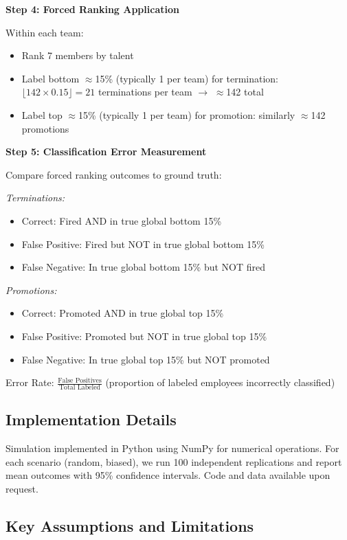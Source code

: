 \documentclass[12pt]{article}
\begin{document}
\textbf{Step 4: Forced Ranking Application}

Within each team:
\begin{itemize}
\item Rank 7 members by talent
\item Label bottom $\approx$15\% (typically 1 per team) for termination: $\lfloor 142 \times 0.15 \rfloor = 21$ terminations per team $\rightarrow$ $\approx$142 total
\item Label top $\approx$15\% (typically 1 per team) for promotion: similarly $\approx$142 promotions
\end{itemize}

\textbf{Step 5: Classification Error Measurement}

Compare forced ranking outcomes to ground truth:

\emph{Terminations:}
\begin{itemize}
\item Correct: Fired AND in true global bottom 15\%
\item False Positive: Fired but NOT in true global bottom 15\%
\item False Negative: In true global bottom 15\% but NOT fired
\end{itemize}

\emph{Promotions:}
\begin{itemize}
\item Correct: Promoted AND in true global top 15\%
\item False Positive: Promoted but NOT in true global top 15\%
\item False Negative: In true global top 15\% but NOT promoted
\end{itemize}

Error Rate: $\frac{\text{False Positives}}{\text{Total Labeled}}$ (proportion of labeled employees incorrectly classified)

\subsection{Implementation Details}

Simulation implemented in Python using NumPy for numerical operations. For each scenario (random, biased), we run 100 independent replications and report mean outcomes with 95\% confidence intervals. Code and data available upon request.

\subsection{Key Assumptions and Limitations}
\end{document}

